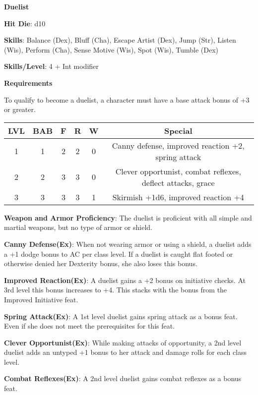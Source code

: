 \textbf{\huge{Duelist}}

\textbf{Hit Die}: d10

\textbf{Skills}: Balance (Dex), Bluff (Cha), Escape Artist (Dex), Jump (Str), Listen (Wis), Perform (Cha), Sense Motive (Wis), Spot (Wis), Tumble (Dex)

\textbf{Skills/Level}: 4 + Int modifier

\textbf{\large{Requirements}}

To qualify to become a duelist, a character must have a base attack bonus of +3 or greater.

\begin{center}
\begin{adjustwidth}{-4cm}{}
\begin{small}
\begin{tabular}{| c | c | c | c | c | c |}
\hline
LVL &BAB &F &R &W &Special \\
\hline
1 &1 &2 &2 &0 &Canny defense, improved reaction +2, spring attack \\
2 &2 &3 &3 &0 &Clever opportunist, combat reflexes, deflect attacks, grace \\
3 &3 &3 &3 &1 &Skirmish +1d6, improved reaction +4 \\
\hline
\end{tabular}
\end{small}
\end{adjustwidth}
\end{center}

\textbf{Weapon and Armor Proficiency}: The duelist is proficient with all simple and martial weapons, but no type of armor or shield.

\textbf{Canny Defense(Ex)}: When not wearing armor or using a shield, a duelist adds a +1 dodge bonus to AC per class level. If a duelist is caught flat footed or otherwise denied her Dexterity bonus, she also loses this bonus.

\textbf{Improved Reaction(Ex)}: A duelist gains a +2 bonus on initiative checks. At 3rd level this bonus increases to +4. This stacks with the bonus from the Improved Initiative feat.

\textbf{Spring Attack(Ex)}: A 1st level duelist gains spring attack as a bonus feat. Even if she does not meet the prerequisites for this feat.

\textbf{Clever Opportunist(Ex)}: While making attacks of opportunity, a 2nd level duelist adds an untyped +1 bonus to her attack and damage rolls for each class level.

\textbf{Combat Reflexes(Ex)}: A 2nd level duelist gains combat reflexes as a bonus feat.


